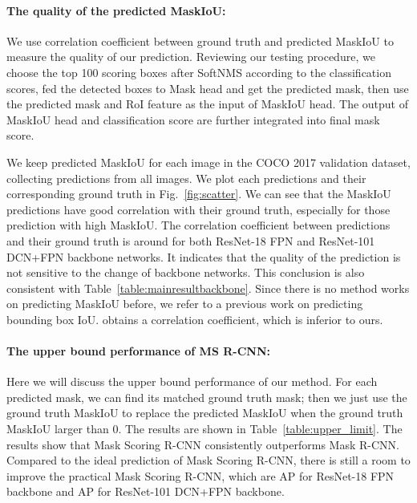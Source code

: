 \documentclass[10pt,twocolumn,letterpaper]{article}
\begin{document}
\paragraph{The quality of the predicted MaskIoU:}
    We use correlation coefficient between ground truth and predicted MaskIoU to measure the quality of our prediction. Reviewing our testing procedure, we choose the top 100 scoring boxes after SoftNMS according to the classification scores, fed the detected boxes to Mask head and get the predicted mask, then use the predicted mask and RoI feature as the input of MaskIoU head. The output of MaskIoU head and classification score are further integrated into final mask score. 


    We keep  predicted MaskIoU for each image in the COCO 2017 validation dataset, collecting  predictions from all  images. We plot each predictions and their corresponding ground truth in Fig.~\ref{fig:scatter}.
We can see that the MaskIoU predictions have good correlation with their ground truth, especially for those prediction with high MaskIoU.
The correlation coefficient between predictions and their ground truth is around \textbf{} for both ResNet-18 FPN and ResNet-101 DCN+FPN backbone networks. It indicates that the quality of the prediction is not sensitive to the change of backbone networks. This conclusion is also consistent with Table~\ref{table:mainresultbackbone}. 
    Since there is no method works on predicting MaskIoU before, we refer to a previous work \cite{jiang2018acquisition} on predicting bounding box IoU.  \cite{jiang2018acquisition} obtains a  correlation coefficient, which is inferior to ours. 
    


 
    
\paragraph{The upper bound performance of MS R-CNN:}

    Here we will discuss the upper bound performance of our method. For each predicted mask, we can find its matched ground truth mask; then we just use the ground truth MaskIoU to replace the predicted MaskIoU when the ground truth MaskIoU larger than 0. The results are shown in Table~\ref{table:upper_limit}. 
    The results show that Mask Scoring R-CNN consistently outperforms Mask R-CNN. Compared to the ideal prediction of Mask Scoring R-CNN, there is still a room to improve the practical Mask Scoring R-CNN, which are  AP for ResNet-18 FPN backbone and  AP for ResNet-101 DCN+FPN backbone.
    
\end{document}
